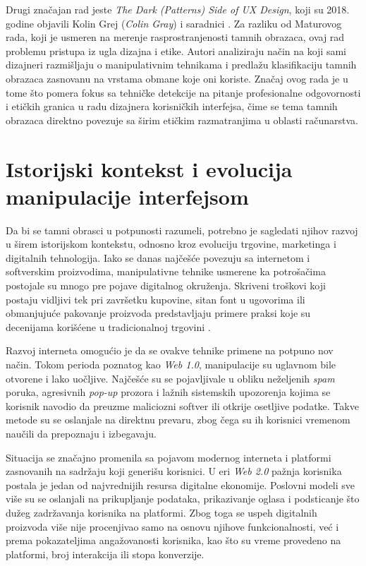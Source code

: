 \documentclass[12pt,a4paper]{article}
\begin{document}
Drugi značajan rad jeste \emph{The Dark (Patterns) Side of UX Design}, koji su 2018. godine objavili Kolin Grej (\emph{Colin Gray}) i saradnici \cite{gray2018the}. Za razliku od Maturovog rada, koji je usmeren na merenje rasprostranjenosti tamnih obrazaca, ovaj rad problemu pristupa iz ugla dizajna i etike. Autori analiziraju način na koji sami dizajneri razmišljaju o manipulativnim tehnikama i predlažu klasifikaciju tamnih obrazaca zasnovanu na vrstama obmane koje oni koriste. Značaj ovog rada je u tome što pomera fokus sa tehničke detekcije na pitanje profesionalne odgovornosti i etičkih granica u radu dizajnera korisničkih interfejsa, čime se tema tamnih obrazaca direktno povezuje sa širim etičkim razmatranjima u oblasti računarstva.

\section{Istorijski kontekst i evolucija manipulacije interfejsom}

Da bi se tamni obrasci u potpunosti razumeli, potrebno je sagledati njihov razvoj u širem istorijskom kontekstu, odnosno kroz evoluciju trgovine, marketinga i digitalnih tehnologija. Iako se danas najčešće povezuju sa internetom i softverskim proizvodima, manipulativne tehnike usmerene ka potrošačima postojale su mnogo pre pojave digitalnog okruženja. Skriveni troškovi koji postaju vidljivi tek pri završetku kupovine, sitan font u ugovorima ili obmanjujuće pakovanje proizvoda predstavljaju primere praksi koje su decenijama korišćene u tradicionalnoj trgovini \cite{brignull2010dark}.

Razvoj interneta omogućio je da se ovakve tehnike primene na potpuno nov način. Tokom perioda poznatog kao \emph{Web 1.0}, manipulacije su uglavnom bile otvorene i lako uočljive. Najčešće su se pojavljivale u obliku neželjenih \emph{spam} poruka, agresivnih \emph{pop-up} prozora i lažnih sistemskih upozorenja kojima se korisnik navodio da preuzme maliciozni softver ili otkrije osetljive podatke. Takve metode su se oslanjale na direktnu prevaru, zbog čega su ih korisnici vremenom naučili da prepoznaju i izbegavaju.

Situacija se značajno promenila sa pojavom modernog interneta i platformi zasnovanih na sadržaju koji generišu korisnici. U eri \emph{Web 2.0} pažnja korisnika postala je jedan od najvrednijih resursa digitalne ekonomije. Poslovni modeli sve više su se oslanjali na prikupljanje podataka, prikazivanje oglasa i podsticanje što dužeg zadržavanja korisnika na platformi. Zbog toga se uspeh digitalnih proizvoda više nije procenjivao samo na osnovu njihove funkcionalnosti, već i prema pokazateljima angažovanosti korisnika, kao što su vreme provedeno na platformi, broj interakcija ili stopa konverzije.
\end{document}
